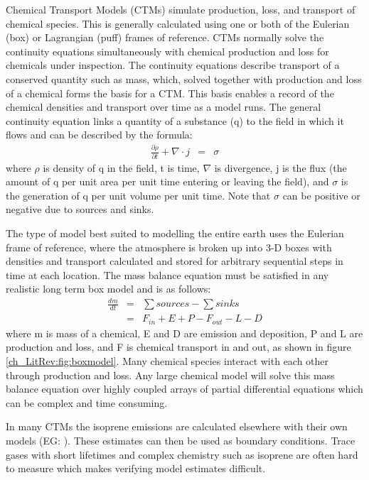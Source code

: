     Chemical Transport Models (CTMs) simulate production, loss, and transport of chemical species.
    This is generally calculated using one or both of the Eulerian (box) or Lagrangian (puff) frames of reference.
    CTMs normally solve the continuity equations simultaneously with chemical production and loss for chemicals under inspection. 
    The continuity equations describe transport of a conserved quantity such as mass, which, solved together with production and loss of a chemical forms the basis for a CTM.
    This basis enables a record of the chemical densities and transport over time as a model runs.
    The general continuity equation links a quantity of a substance (q) to the field in which it flows and can be described by the formula:
    \begin{eqnarray*}
      \frac{\partial \rho}{\partial t} + \nabla \cdot j &=& \sigma 
    \end{eqnarray*}
    where $\rho$ is density of q in the field, t is time, $\nabla$ is divergence, j is the flux (the amount of q per unit area per unit time entering or leaving the field), and $\sigma$ is the generation of q per unit volume per unit time.
    Note that $\sigma$ can be positive or negative due to sources and sinks.
    
    The type of model best suited to modelling the entire earth uses the Eulerian frame of reference, where the atmosphere is broken up into 3-D boxes with densities and transport calculated and stored for arbitrary sequential steps in time at each location.
    The mass balance equation must be satisfied in any realistic long term box model and is as follows: 
    \begin{align*}
      \frac{dm}{dt} &=& \sum{sources}-\sum{sinks} \\
      &=& F_{in} + E + P - F_{out} - L - D 
    \end{align*}
    where m is mass of a chemical, E and D are emission and deposition, P and L are production and loss, and F is chemical transport in and out, as shown in figure \ref{ch_LitRev:fig:boxmodel}.
    Many chemical species interact with each other through production and loss. 
    Any large chemical model will solve this mass balance equation over highly coupled arrays of partial differential equations which can be complex and time consuming.
    
    In many CTMs the isoprene emissions are calculated elsewhere with their own models (EG: \citet{Guenther2006}).
    These estimates can then be used as boundary conditions.
    Trace gases with short lifetimes and complex chemistry such as isoprene are often hard to measure which makes verifying model estimates difficult.
    
